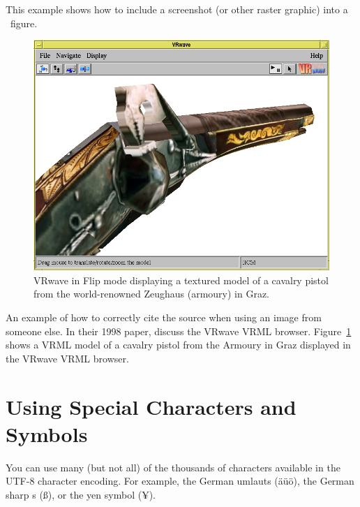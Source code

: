 This example shows how to include a screenshot (or other raster
graphic) into a \LaTeXe\ figure.

\begin{figure}[tp]
\centering
\includegraphics[keepaspectratio,width=\linewidth,height=\halfh]
{images/pist.png}

\caption[VRwave in Flip Mode]
{%
VRwave in Flip mode displaying a textured model of a cavalry pistol
from the world-renowned Zeughaus (armoury) in Graz.
}
\label{fig:Pistol}
\end{figure}


An example of how to correctly cite the source when using an image
from someone else. In their 1998 paper, \textcite{Andrews-VRwave}
discuss the VRwave VRML browser. Figure~\ref{fig:Pistol} shows a VRML
model of a cavalry pistol from the Armoury in Graz displayed in the
VRwave VRML browser.





\section{Using Special Characters and Symbols}

You can use many (but not all) of the thousands of characters
available in the UTF-8 \parencites{Wikipedia-UTF8}{Unicode-Charts}
character encoding. For example, the German umlauts (äüö), the German
sharp s (ß), or the yen symbol (¥).

